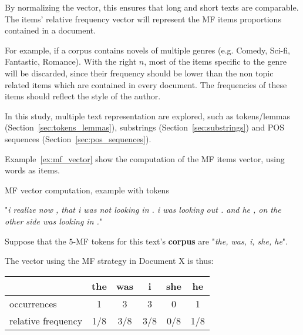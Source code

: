 By normalizing the vector, this ensures that long and short texts are comparable.
The items' relative frequency vector will represent the MF items proportions contained in a document.

For example, if a corpus contains novels of multiple genres (e.g. Comedy, Sci-fi, Fantastic, Romance).
With the right $n$, most of the items specific to the genre will be discarded, since their frequency should be lower than the non topic related items which are contained in every document.
The frequencies of these items should reflect the style of the author.

In this study, multiple text representation are explored, such as tokens/lemmas (Section~\ref{sec:tokens_lemmas}), substrings (Section~\ref{sec:substrings}) and POS sequences (Section~\ref{sec:pos_sequences}).

Example~\ref{ex:mf_vector} show the computation of the MF items vector, using words as items.

\begin{example}
  \centering
  \caption{MF vector computation, example with tokens}
  \label{ex:mf_vector}

  \begin{subexample}{\linewidth}
    "\textit{i realize now , that i was not looking in . i was looking out . and he , on the other side was looking in .}"\cite{ddlc}
  \end{subexample}

  \vspace{0.5cm}

  \begin{subexample}{\linewidth}
    Suppose that the $5$-MF tokens for this text's \textbf{corpus} are "\textit{the, was, i, she, he}".

    The vector using the MF strategy in Document X is thus:
    \vspace{0.2cm}

    \centering
    \begin{tabular}{l c c c c c}
      \toprule
                       & the & was & i   & she & he  \\
      \midrule
      occurrences         & 1   & 3   & 3   & 0   & 1   \\
      relative frequency & 1/8 & 3/8 & 3/8 & 0/8 & 1/8 \\
      \bottomrule
    \end{tabular}
  \end{subexample}
\end{example}

